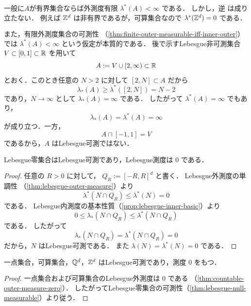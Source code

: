 \begin{remark}
一般に$A$が有界集合ならば外測度有限 $\lambda^*(A)<\infty$ である．
しかし，逆
は成り立たない．
例えば $\mathbb Z^d$ は非有界であるが，可算集合なので
$\lambda^*(\mathbb Z^d)=0$
である．

また，有限外測度集合の可測性
（\cref{thm:finite-outer-measurable-iff-inner-outer}）では
$\lambda^*(A)<\infty$ という仮定が本質的である．
後で示すLebesgue非可測集合 $V\subset[0,1]\subset\mathbb R$ を用いて
\[
A:=V\cup[2,\infty)\subset\mathbb R
\]
とおく．このとき任意の $N>2$ に対して $[2,N]\subset A$ だから
\[
\lambda_*(A)\ge \lambda^*([2,N])=N-2
\]
であり，$N\to\infty$ として $\lambda_*(A)=\infty$ である．
したがって $\lambda^*(A)=\infty$ でもあり，
\[
\lambda_*(A)=\lambda^*(A)=\infty
\]
が成り立つ．一方，
\[
A\cap[-1,1]=V
\]
であるから，$A$ はLebesgue可測ではない．
\end{remark}


\begin{theorem}[Lebesgue零集合]\label{thm:lebesgue-null-measurable}
Lebesgue零集合はLebesgue可測であり，Lebesgue測度は $0$ である．
\end{theorem}
\begin{proof}
任意の $R>0$ に対して，
$Q_R := [-R,R]^d$ と書く．
Lebesgue外測度の単調性
（\cref{thm:lebesgue-outer-measure}）より
\[
\lambda^*(N\cap Q_R)\le \lambda^*(N)=0
\]
である．
Lebesgue内測度の基本性質（\cref{prop:lebesgue-inner-basic}）より
\[
0\le \lambda_*(N\cap Q_R)
\le
\lambda^*(N\cap Q_R)
\]
である．
したがって
\[
\lambda_*(N\cap Q_R)
=
\lambda^*(N\cap Q_R)
=0
\]
だから，$N$ はLebesgue可測である．
また $\lambda(N)=\lambda^*(N)=0$ である．
\end{proof}

\begin{corollary}[可算集合]\label{cor:countable-lebesgue-null}
一点集合，可算集合，$\mathbb Q^d$，$\mathbb Z^d$ はLebesgue可測であり，測度 $0$ をもつ．
\end{corollary}
\begin{proof}
一点集合および可算集合のLebesgue外測度は $0$ である
（\cref{thm:countable-outer-measure-zero}）．
したがってLebesgue零集合の可測性（\cref{thm:lebesgue-null-measurable}）より従う．
\end{proof}

